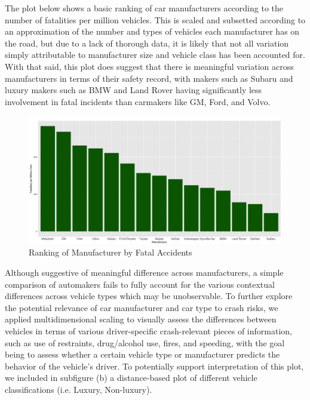 \documentclass[11pt, oneside,titlepage]{article}   	%
\begin{document}
The plot below shows a basic ranking of car manufacturers according to the number of fatalities per million vehicles. This is scaled and subsetted according to an approximation of the number and types of vehicles each manufacturer has on the road, but due to a lack of thorough data, it is likely that not all variation simply attributable to manufacturer size and vehicle class has been accounted for. With that said, this plot does suggest that there is meaningful variation across manufacturers in terms of their safety record, with makers such as Subaru and luxury makers such as BMW and Land Rover having significantly less involvement in fatal incidents than carmakers like GM, Ford, and Volvo.
\\
\begin{figure}[H]
\begin{center}
\includegraphics[width=.9\textwidth]{ManufacturerRankingPlot.png}
\end{center}
\caption{Ranking of Manufacturer by Fatal Accidents}
\end{figure}

Although suggestive of meaningful difference across manufacturers, a simple comparison of automakers fails to fully account for the various contextual differences across vehicle types which may be unobservable. To further explore the potential relevance of car manufacturer and car type to crash risks, we applied multidimensional scaling to visually assess the differences between vehicles in terms of various driver-specific crash-relevant pieces of information, such as use of restraints, drug/alcohol use, fires, and speeding, with the goal being to assess whether a certain vehicle type or manufacturer predicts the behavior of the vehicle's driver. To potentially support interpretation of this plot, we included in subfigure (b) a distance-based plot of different vehicle classifications (i.e. Luxury, Non-luxury). \\
\end{document}
